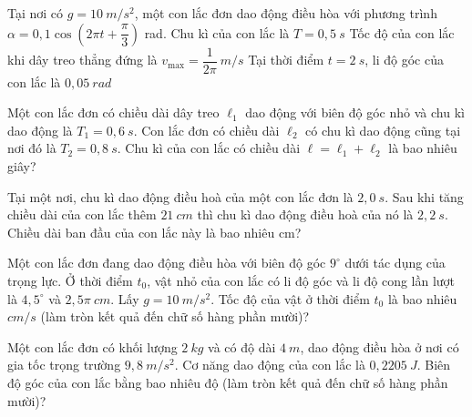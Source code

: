 \begin{ex}
Tại nơi có $g = 10\ m/s^2$, một con lắc đơn dao động điều hòa với phương trình $\alpha = 0,1 \cos \left(2\pi t + \dfrac{\pi}{3}\right)$ rad.
{Chu kì của con lắc là $T = 0,5\ s$}
{\True Tốc độ của con lắc khi dây treo thẳng đứng là $v_{\max} = \dfrac{1}{2\pi}\ m/s$}
{\True Tại thời điểm $t = 2\ s$, li độ góc của con lắc là $0,05\ rad$}
\end{ex}
\PhanIII
\setcounter{ex}{0}
\begin{ex}
Một con lắc đơn có chiều dài dây treo $\ell_1$ dao động với biên độ góc nhỏ và chu kì dao động là $T_1=0,6 \ s$. Con lắc đơn có chiều dài $\ell_2$ có chu kì dao động cũng tại nơi đó là $T_2=0,8 \ s$. Chu kì của con lắc có chiều dài $\ell=\ell_1+\ell_2$ là bao nhiêu giây?
 
\end{ex} 
\begin{ex}
Tại một nơi, chu kì dao động điều hoà của một con lắc đơn là $2,0 \ s$. Sau khi tăng chiều dài của con lắc thêm $21 \ cm$ thì chu kì dao động điều hoà của nó là $2,2 \ s$. Chiều dài ban đầu của con lắc này là bao nhiêu cm?
\end{ex} 
\begin{ex}
Một con lắc đơn đang dao động điều hòa với biên độ góc $9^\circ$ dưới tác dụng của trọng lực. Ở thời điểm $t_0$, vật nhỏ của con lắc có li độ góc và li độ cong lần lượt là $4,5^\circ$ và $2,5 \pi\ cm$. Lấy $g=10 \ m/s^2$. Tốc độ của vật ở thời điểm $t_0$ là bao nhiêu $cm/s$ (làm tròn kết quả đến chữ số hàng phần mười)?
\end{ex} 
\begin{ex}%
Một con lắc đơn có khối lượng $2\ kg$ và có độ dài $4\ m$, dao động điều hòa ở nơi có gia tốc trọng trường $9,8\ m/s^2$. Cơ năng dao động của con lắc là $0,2205\ J$. Biên độ góc của con lắc bằng bao nhiêu độ (làm tròn kết quả đến chữ số hàng phần mười)?
\end{ex} 

